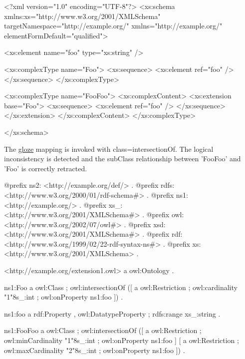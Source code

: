 \begin{DoxyCodeInclude}
<?xml version="1.0" encoding="UTF-8"?>
<xs:schema xmlns:xs="http://www.w3.org/2001/XMLSchema" 
        targetNamespace="http://example.org/" xmlns="http://example.org/"
        elementFormDefault="qualified">
        
        <xs:element name="foo" type="xs:string" />
                
        <xs:complexType name="Foo">
                <xs:sequence>
                        <xs:element ref="foo" />
                </xs:sequence>
        </xs:complexType>
        
        <xs:complexType name="FooFoo">
                <xs:complexContent>
                        <xs:extension base="Foo">
                                <xs:sequence>
                                        <xs:element ref="foo" />
                                </xs:sequence>
                        </xs:extension>
                </xs:complexContent>
        </xs:complexType>       
        
</xs:schema>
\end{DoxyCodeInclude}


The \hyperlink{namespacecom_1_1hp_1_1gloze}{gloze} mapping is invoked with class=intersectionOf. The logical inconsistency is detected and the subClass relationship between 'FooFoo' and 'Foo' is correctly retracted.


\begin{DoxyCodeInclude}
@prefix ns2:     <http://example.org/def/> .
@prefix rdfs:    <http://www.w3.org/2000/01/rdf-schema#> .
@prefix ns1:     <http://example.org/> .
@prefix xs_:     <http://www.w3.org/2001/XMLSchema#> .
@prefix owl:     <http://www.w3.org/2002/07/owl#> .
@prefix xsd:     <http://www.w3.org/2001/XMLSchema#> .
@prefix rdf:     <http://www.w3.org/1999/02/22-rdf-syntax-ns#> .
@prefix xs:      <http://www.w3.org/2001/XMLSchema> .

<http://example.org/extension1.owl>
      a       owl:Ontology .

ns1:Foo
      a       owl:Class ;
      owl:intersectionOf ([ a       owl:Restriction ;
                  owl:cardinality "1"^^xs_:int ;
                  owl:onProperty ns1:foo
                ]) .

ns1:foo
      a       rdf:Property , owl:DatatypeProperty ;
      rdfs:range xs_:string .

ns1:FooFoo
      a       owl:Class ;
      owl:intersectionOf ([ a       owl:Restriction ;
                  owl:minCardinality "1"^^xs_:int ;
                  owl:onProperty ns1:foo
                ] [ a       owl:Restriction ;
                  owl:maxCardinality "2"^^xs_:int ;
                  owl:onProperty ns1:foo
                ]) .
\end{DoxyCodeInclude}
 